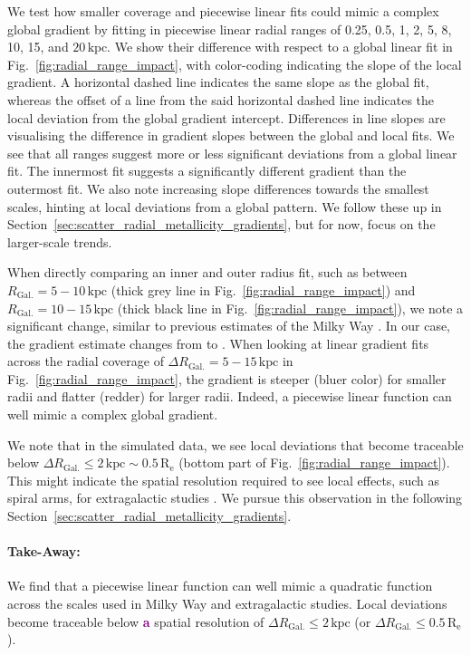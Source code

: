 \documentclass[twocolumn,apj,numberedappendix,appendixfloats,twocolappendix]{openjournal}
\newcommand{\adjusted}[1]{\textbf{\textcolor{purple}{#1}}}
\begin{document}
\begin{CJK*}{UTF8}{gbsn}
We test how smaller coverage and piecewise linear fits could mimic a complex global gradient by fitting in piecewise linear radial ranges of 0.25, 0.5, 1, 2, 5, 8, 10, 15, and $20\,\mathrm{kpc}$. We show their difference with respect to a global linear fit in Fig.~\ref{fig:radial_range_impact}, with color-coding indicating the slope of the local gradient. A horizontal dashed line indicates the same slope as the global fit, whereas the offset of a line from the said horizontal dashed line indicates the local deviation from the global gradient intercept. Differences in line slopes are visualising the difference in gradient slopes between the global and local fits. We see that all ranges suggest more or less significant deviations from a global linear fit. The innermost fit suggests a significantly different gradient than the outermost fit. We also note increasing slope differences towards the smallest scales, hinting at local deviations from a global pattern. We follow these up in Section~\ref{sec:scatter_radial_metallicity_gradients}, but for now, focus on the larger-scale trends.

When directly comparing an inner and outer radius fit, such as between $R_\mathrm{Gal.} = 5-10\,\mathrm{kpc}$ (thick grey line in Fig.~\ref{fig:radial_range_impact}) and $R_\mathrm{Gal.} = 10-15\,\mathrm{kpc}$ (thick black line in Fig.~\ref{fig:radial_range_impact}), we note a significant change, similar to previous estimates of the Milky Way \citep[e.g.][]{Yong2012, Lemasle2008}. In our case, the gradient estimate changes from  to . When looking at linear gradient fits across the radial coverage of $\Delta R_\mathrm{Gal.} = 5-15\,\mathrm{kpc}$ in Fig.~\ref{fig:radial_range_impact}, the gradient is steeper (bluer color) for smaller radii and flatter (redder) for larger radii. Indeed, a piecewise linear function can well mimic a complex global gradient.

We note that in the simulated data, we see local deviations that become traceable below $\Delta R_\mathrm{Gal.} \leq 2\,\mathrm{kpc} \sim 0.5\,\mathrm{R_e}$ (bottom part of Fig.~\ref{fig:radial_range_impact}). This might indicate the spatial resolution required to see local effects, such as spiral arms, for extragalactic studies \citep[see also][]{Krumholz2018b, Li2024b}. We pursue this observation in the following Section~\ref{sec:scatter_radial_metallicity_gradients}.

\paragraph*{Take-Away:} We find that a piecewise linear function can well mimic a quadratic function across the scales used in Milky Way and extragalactic studies. Local deviations become traceable below \adjusted{a} spatial resolution of $\Delta R_\mathrm{Gal.} \leq 2\,\mathrm{kpc}$ (or $\Delta R_\mathrm{Gal.} \leq 0.5\,\mathrm{R_e}$).


\end{CJK*}
\end{document}
